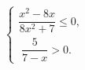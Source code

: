 \begin{ex}[type=ineq_system]
	\begin{condition}
		$\begin{cases} \dfrac{x^2 - 8x}{8x^2 + 7}\leqslant0  ,\\
			\; \dfrac{5}{7 - x}>0  .
		\end{cases}$
	\end{condition}
	\answer{$ [0;7)   .$}
\end{ex}